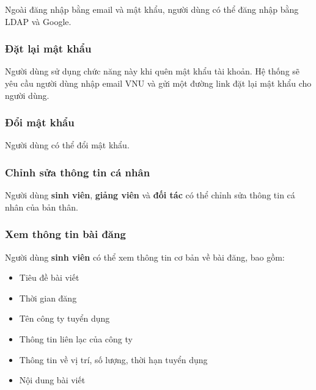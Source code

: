 \documentclass[./../main.tex]{subfiles}
\begin{document}
Ngoài đăng nhập bằng email và mật khẩu, người dùng có thể đăng nhập bằng
LDAP và Google.
  
\hypertarget{ux111ux1eb7t-lux1ea1i-mux1eadt-khux1ea9u}{%
	\subsubsection{Đặt lại mật
		khẩu}\label{ux111ux1eb7t-lux1ea1i-mux1eadt-khux1ea9u}}
  
Người dùng sử dụng chức năng này khi quên mật khẩu tài khoản. Hệ thống
sẽ yêu cầu người dùng nhập email VNU và gửi một đường link đặt lại mật
khẩu cho người dùng.
  
\hypertarget{ux111ux1ed5i-mux1eadt-khux1ea9u}{%
	\subsubsection{Đổi mật khẩu}\label{ux111ux1ed5i-mux1eadt-khux1ea9u}}
  
Người dùng có thể đổi mật khẩu.
  
\hypertarget{chux1ec9nh-sux1eeda-thuxf4ng-tin-cuxe1-nhuxe2n}{%
	\subsubsection{Chỉnh sửa thông tin cá
		nhân}\label{chux1ec9nh-sux1eeda-thuxf4ng-tin-cuxe1-nhuxe2n}}
  
Người dùng \textbf{sinh viên}, \textbf{giảng viên} và \textbf{đối tác}
có thể chỉnh sửa thông tin cá nhân của bản thân.
  
\hypertarget{xem-thuxf4ng-tin-buxe0i-ux111ux103ng}{%
	\subsubsection{Xem thông tin bài
		đăng}\label{xem-thuxf4ng-tin-buxe0i-ux111ux103ng}}
  
Người dùng \textbf{sinh viên} có thể xem thông tin cơ bản về bài đăng,
bao gồm:
  
\begin{itemize}
	\item Tiêu đề bài viết
	\item Thời gian đăng
	\item Tên công ty tuyển dụng
	\item Thông tin liên lạc của công ty
	\item Thông tin về vị trí, số lượng, thời hạn tuyển dụng
	\item Nội dung bài viết
\end{itemize}
\end{document}
